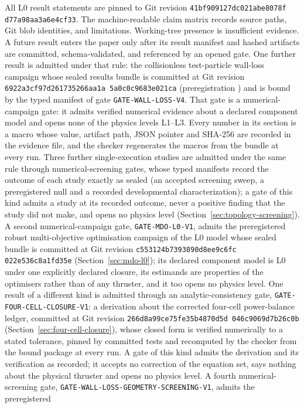 \documentclass[11pt]{article}
\newcommand{\EvidenceRevision}{\texttt{41bf909\allowbreak{}127dc021\allowbreak{}abe8078f\allowbreak{}
d77a98aa\allowbreak{}3a6e4cf33}}
\newcommand{\WallLossEvidenceRevision}{\texttt{6922a3cf\allowbreak{}97d26173\allowbreak{}5266aa1a\allowbreak{}%
5a0c0c96\allowbreak{}83e021ca}}
\newcommand{\MdoEvidenceRevision}{\texttt{c553124b\allowbreak{}7393890d\allowbreak{}8ee9c6fc\allowbreak{}%
022e536c\allowbreak{}8a1fd35e}}
\newcommand{\ClosureEvidenceRevision}{\texttt{266d8a99\allowbreak{}ce75fe35\allowbreak{}b4870d5d\allowbreak{}%
046c9069\allowbreak{}d7b26c0b}}
\begin{document}
All L0 result statements are pinned to Git revision
\EvidenceRevision. The machine-readable
claim matrix records source paths, Git blob identities, and limitations.
Working-tree presence is insufficient evidence. A future result enters the
paper only after its result manifest and hashed artifacts are committed,
schema-validated, and referenced by an opened gate. One further result is
admitted under that rule: the collisionless test-particle wall-loss campaign
whose sealed results bundle is committed at Git revision
\WallLossEvidenceRevision{} (preregistration \texttt{\WlfPreregCommit}) and is
bound by the typed manifest of gate \texttt{GATE-WALL-LOSS-V4}. That gate is a
numerical-campaign gate: it admits verified numerical evidence about a declared
component model and opens none of the physics levels L1--L3. Every number in
its section is a macro whose value, artifact path, JSON pointer and SHA-256 are
recorded in the evidence file, and the checker regenerates the macros from the
bundle at every run. Three further single-execution studies are admitted under
the same rule through numerical-screening gates, whose typed manifests record
the outcome of each study exactly as sealed (an accepted screening sweep, a
preregistered null and a recorded developmental characterization); a gate of
this kind admits a study at its recorded outcome, never a positive finding
that the study did not make, and opens no physics level
(Section~\ref{sec:topology-screening}). A second numerical-campaign gate,
\texttt{GATE-MDO-L0-V1}, admits the preregistered robust multi-objective
optimisation campaign of the L0 model whose sealed bundle is committed at Git
revision \MdoEvidenceRevision{} (Section~\ref{sec:mdo-l0}); its declared
component model is L0 under one explicitly declared closure, its estimands are
properties of the optimisers rather than of any thruster, and it too opens no
physics level. One result of a different kind is admitted through an
analytic-consistency gate, \texttt{GATE-FOUR-CELL-CLOSURE-V1}: a derivation
about the corrected four-cell power-balance ledger, committed at Git revision
\ClosureEvidenceRevision{} (Section~\ref{sec:four-cell-closure}), whose closed
form is verified numerically to a stated tolerance, pinned by committed tests
and recomputed by the checker from the bound package at every run. A gate of
this kind admits the derivation and its verification as recorded; it accepts no
correction of the equation set, says nothing about the physical thruster and
opens no physics level. A fourth numerical-screening gate,
\texttt{GATE-WALL-LOSS-GEOMETRY-SCREENING-V1}, admits the preregistered
\end{document}
